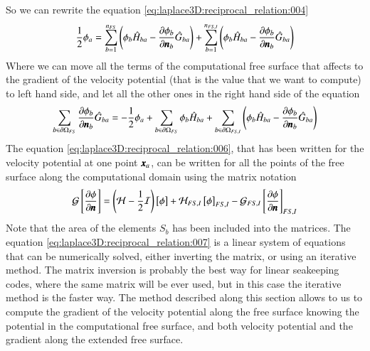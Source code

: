 %
So we can rewrite the equation \ref{eq:laplace3D:reciprocal_relation:004}
%
\begin{eqnarray}
	\label{eq:laplace3D:reciprocal_relation:005}
	\frac{1}{2} \phi_a
	=
	\dsty \sum_{b=1}^{n_{FS}}
	\left(
		\phi_b \hat H_{ba} - \frac{\partial \phi_b}{\partial \bs{n}_b} \hat G_{ba}
	\right)
	+
	\dsty \sum_{b=1}^{n_{FS,I}}
	\left(
		\phi_b \hat H_{ba} - \frac{\partial \phi_b}{\partial \bs{n}_b} \hat G_{ba}
	\right)
\end{eqnarray}
%
Where we can move all the terms of the computational free surface that affects
to the gradient of the velocity potential (that is the value that we want to
compute) to left hand side, and let all the other ones in the right hand side
of the equation
%
\begin{eqnarray}
	\label{eq:laplace3D:reciprocal_relation:006}
	\dsty \sum_{b \in \partial \Omega_{FS}}
		\frac{\partial \phi_b}{\partial \bs{n}_b} \hat G_{ba}
	=
	-
	\frac{1}{2} \phi_a
	+
	\dsty \sum_{b \in \partial \Omega_{FS}}
		\phi_b \hat H_{ba}
	+
	\dsty \sum_{b \in \partial \Omega_{FS,I}}
		\left(
		\phi_b \hat H_{ba} -
		\frac{\partial \phi_b}{\partial \bs{n}_b} \hat G_{ba} 
		\right)
\end{eqnarray}
%
The equation \ref{eq:laplace3D:reciprocal_relation:006}, that
has been written for the velocity potential at one point $\bs{x}_a$,
can be written for all the points of the free surface along
the computational domain using the matrix notation
%
\begin{eqnarray}
	\label{eq:laplace3D:reciprocal_relation:007}
	\mathcal{G} \left[ \frac{ \partial \phi}{\partial \bs{n}} \right]
	=
	\left( \mathcal{H} - \frac{1}{2} \mathcal{I} \right) \left[ \phi \right]
	+
	\mathcal{H}_{FS,I} \left[ \phi \right]_{FS,I}
	-
	\mathcal{G}_{FS,I} \left[ \frac{ \partial \phi}{\partial \bs{n}} \right]_{FS,I}
\end{eqnarray}
%
Note that the area of the elements $S_b$ has been included into
the matrices. The equation
\ref{eq:laplace3D:reciprocal_relation:007} is a linear system
of equations that can be numerically solved, either inverting
the matrix, or using an iterative method. The matrix inversion
is probably the best way for linear seakeeping codes, where the
same matrix will be ever used, but in this case the iterative
method is the faster way.\rc
%
The method described along this section allows to us to compute
the gradient of the velocity potential along the free surface
knowing the potential in the computational free surface, and both
velocity potential and the gradient along the extended free
surface.
%
